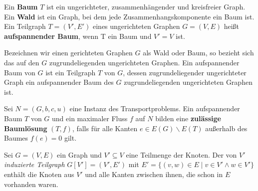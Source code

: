 \begin{defn}Ein \textbf{Baum} $T$ ist ein ungerichteter, zusammenhängender und kreisfreier Graph. Ein \textbf{Wald} ist ein Graph, bei dem jede Zusammenhangskomponente ein Baum ist. Ein Teilgraph $T=(V',E')$ eines ungerichteten Graphen $G=(V,E)$ heißt \textbf{aufspannender Baum}, wenn T ein Baum und $V'=V$ ist.\end{defn}

\begin{anm}Bezeichnen wir einen gerichteten Graphen $G$ als Wald oder Baum, so bezieht sich das auf den $G$ zugrundeliegenden ungerichteten Graphen. Ein aufspannender Baum von $G$ ist ein Teilgraph $T$ von $G$, dessen zugrundeliegender ungerichteter Graph ein aufspannender Baum des $G$ zugrundeliegenden ungerichteten Graphen ist.\end{anm}

\begin{defn}Sei $N=(G,b,c,u)$ eine Instanz des Transportproblems. Ein aufspannender Baum $T$ von $G$ und ein maximaler Fluss $f$ auf $N$ bilden eine \textbf{zulässige Baumlösung} $(T,f)$, falls für alle Kanten $e\in E(G)\backslash E(T)$ außerhalb des Baumes $f(e) = 0$ gilt.\end{defn}

\begin{nota}Sei $G=(V,E)$ ein Graph und $V'\subseteq V$ eine Teilmenge der Knoten. Der von $V'$ \emph{induzierte Teilgraph} $G[V']=(V',E')$ mit $E'=\{(v,w)\in E\mid v\in V'\land w\in V'\}$ enthält die Knoten aus $V'$ und alle Kanten zwischen ihnen, die schon in $E$ vorhanden waren.\end{nota}

